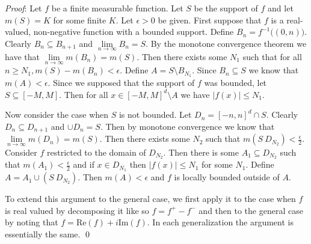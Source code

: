 \documentclass[12pt]{article}
\renewenvironment{proof}{\hspace{-4 ex} \emph{Proof}:}{\qed}
\begin{document}
	\begin{proof}
		Let $f$ be a finite measurable function. Let $S$ be the support of $f$ and let $m(S) = K$ for some finite $K$. Let $\epsilon > 0$ be given.\bigbreak
		First suppose that $f$ is a real-valued, non-negative function with a bounded support.  Define $B_n = f^{-1}\Big( (0,n) \Big)$. Clearly $B_n \subseteq B_{n+1}$ and $\lim\limits_{n \to \infty} B_n = S$. By the monotone convergence theorem we have that $\lim\limits_{n \to \infty} m(B_n) = m(S)$. Then there exists some $N_1$ such that for all $n \geq N_1, m(S) - m(B_n) < \epsilon$. Define $A = S \setminus B_{N_1}$. Since $B_n \subseteq S$ we know that $m(A) < \epsilon$. Since we supposed that the support of $f$ was bounded, let $S \subseteq [-M,M]$. Then for all $x\in[-M,M]^d\setminus A$ we have $ \vert f(x) \vert \leq N_1$.\bigbreak
		
		Now consider the case when $S$ is not bounded. Let $D_n = [-n,n]^d \cap S$. Clearly $D_n \subseteq D_{n+1}$ and $\cup D_n = S$. Then by monotone convergence we know that $\lim\limits_{n \to \infty} m(D_n) = m(S)$. Then there exists some $N_2$ such that $m(S \ D_{N_2}) < \tfrac{\epsilon}{2}$. Consider $f$ restricted to the domain of $D_{N_2}$. Then there is some $A_1 \subseteq D_{N_2}$ such that $m(A_1) < \tfrac{\epsilon}{2}$ and if $x \in D_{N_1}$ then $ \vert f(x) \vert \leq N_1$ for some $N_1$. Define $A = A_1 \cup (S \ D_{N_2})$. Then $m(A) < \epsilon$ and $f$ is locally bounded outside of $A$. \bigbreak
		
		To extend this argument to the general case, we first apply it to the case when $f$ is real valued by decomposing it like so $f = f^+ - f^-$ and then to the general case by noting that $f = \text{Re}(f) + i \text{Im}(f)$. In each generalization the argument is essentially the same.
	\end{proof}
\end{document}
